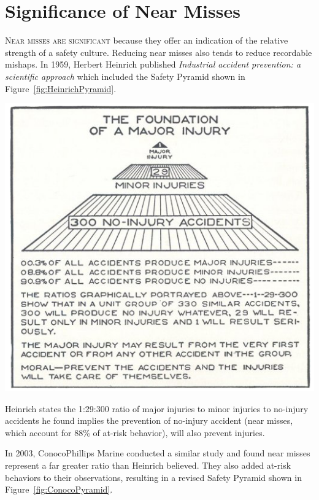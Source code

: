 \documentclass{tufte-handout}
\begin{document}
	\section{Significance of Near Misses}\label{sec:SignificanceNearMiss}
	\textsc{Near misses are significant} because they offer an indication of the relative strength of a safety culture.  Reducing near misses also tends to reduce recordable mishaps.  In 1959, Herbert Heinrich published \textit{Industrial accident prevention: a scientific approach} which included the Safety Pyramid shown in Figure~\ref{fig:HeinrichPyramid}.  
	\begin{marginfigure}
		\includegraphics[width=\linewidth]{HeinrichPyramid}
		\caption{Heinrich states the 1:29:300 ratio of major injuries to minor injuries to no-injury accidents he found implies the prevention of no-injury accident (near misses, which account for 88\% of at-risk behavior), will also prevent injuries.}
		\label{fig:HeinrichPyramid}
	\end{marginfigure}
	In 2003, ConocoPhillips Marine conducted a similar study and found near misses represent a far greater ratio than Heinrich believed.  They also added at-risk behaviors to their observations, resulting in a revised Safety Pyramid shown in Figure~\ref{fig:ConocoPyramid}.
\end{document}
